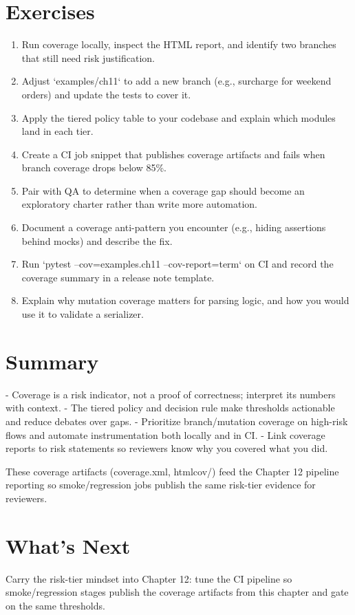 \section{Exercises}
\begin{enumerate}
  \item Run coverage locally, inspect the HTML report, and identify two branches that still need risk justification.
  \item Adjust `examples/ch11` to add a new branch (e.g., surcharge for weekend orders) and update the tests to cover it.
  \item Apply the tiered policy table to your codebase and explain which modules land in each tier.
  \item Create a CI job snippet that publishes coverage artifacts and fails when branch coverage drops below 85\%.
  \item Pair with QA to determine when a coverage gap should become an exploratory charter rather than write more automation.
  \item Document a coverage anti-pattern you encounter (e.g., hiding assertions behind mocks) and describe the fix.
  \item Run `pytest --cov=examples.ch11 --cov-report=term` on CI and record the coverage summary in a release note template.
  \item Explain why mutation coverage matters for parsing logic, and how you would use it to validate a serializer.
\end{enumerate}

\section{Summary}
- Coverage is a risk indicator, not a proof of correctness; interpret its numbers with context.
- The tiered policy and decision rule make thresholds actionable and reduce debates over gaps.
- Prioritize branch/mutation coverage on high-risk flows and automate instrumentation both locally and in CI.
- Link coverage reports to risk statements so reviewers know why you covered what you did.

These coverage artifacts (coverage.xml, htmlcov/) feed the Chapter 12 pipeline reporting so smoke/regression jobs publish the same risk-tier evidence for reviewers.

\section{What's Next}
Carry the risk-tier mindset into Chapter 12: tune the CI pipeline so smoke/regression stages publish the coverage artifacts from this chapter and gate on the same thresholds.

